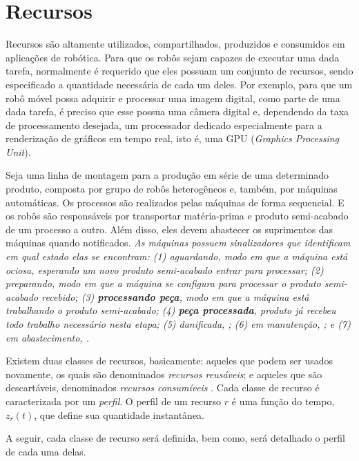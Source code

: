 \chapter[Recursos]{Recursos} \label{cap:recursos}

    Recursos são altamente utilizados, compartilhados, produzidos e consumidos em aplicações de robótica. Para que os robôs sejam capazes de executar uma dada tarefa, normalmente é requerido que eles possuam um conjunto de recursos, sendo especificado a quantidade necessária de cada um deles. Por exemplo, para que um robô móvel possa adquirir e processar uma imagem digital, como parte de uma dada tarefa, é preciso que esse possua uma câmera digital e, dependendo da taxa de processamento desejada, um processador dedicado especialmente para a renderização de gráficos em tempo real, isto é, uma GPU (\textit{Graphics Processing Unit}).
    
    Seja uma linha de montagem para a produção em série de uma determinado produto, composta por grupo de robôs heterogêneos e, também, por máquinas automáticas. Os processos são realizados pelas máquinas de forma sequencial. E os robôs são responsáveis por transportar matéria-prima e produto semi-acabado de um processo a outro. Além disso, eles devem abastecer os suprimentos das máquinas quando notificados. \emph{\color{red} As máquinas possuem sinalizadores que identificam em qual estado elas se encontram: (1) \textit{aguardando}, modo em que a máquina está ociosa, esperando um novo produto semi-acabado entrar para processar; (2) \textit{preparando}, modo em que a máquina se configura para processar o produto semi-acabado recebido; (3) \textit{\textbf{processando peça}}, modo em que a máquina está trabalhando o produto semi-acabado; (4) \textit{\textbf{peça processada}}, produto já recebeu todo trabalho necessário nesta etapa; (5) \textit{danificada}, ; (6) \textit{em manutenção}, ; e (7) \textit{em abastecimento}, .}

    Existem duas classes de recursos, basicamente: aqueles que podem ser usados novamente, os quais são denominados \textit{recursos reusáveis}; e aqueles que são descartáveis, denominados \textit{recursos consumíveis} \cite{ref:ghallab2004automated}. Cada classe de recurso é caracterizada por um \textit{perfil}. O perfil de um recurso $r$ é uma função do tempo, $z_r(t)$, que define sua quantidade instantânea.
    
    A seguir, cada classe de recurso será definida, bem como, será detalhado o perfil de cada uma delas.
    
